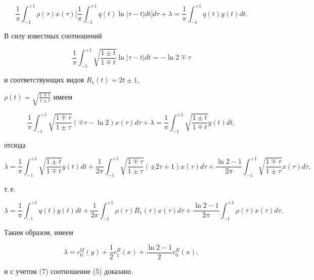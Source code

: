 \begin{pf}
$$


\frac{1}{\pi} \int_{-1}^{+1} \rho(\tau)x(\tau)\bigg[\frac{1}{\pi}


\int_{-1}^{+1}q(t)\ln |\tau-t|dt


\bigg]d\tau + \lambda = \frac{1}{\pi}\int_{-1}^{+1}q(t)y(t)dt.


$$


В силу известных соотношений


$$


\frac{1}{\pi}\int_{-1}^{+1} \sqrt{\frac{1\pm t}{1\mp t}} \ln |\tau-t|dt =


-\ln 2 \mp \tau


$$


и соответствующих видов $R_1(t)=2t\pm 1$,


$\rho(t) = \sqrt{\frac{1\mp t}{1\pm t}}$ имеем


$$


\frac{1}{\pi}\int_{-1}^{+1}\sqrt{\frac{1\mp \tau}{1\pm \tau}}


(\mp \tau- \ln 2)x(\tau)d\tau+\lambda=


\frac{1}{\pi}\int_{-1}^{+1}\sqrt{\frac{1\pm t}{1\mp t}}y(t)dt,


$$


отсюда


$$


\lambda = \frac{1}{\pi}\int_{-1}^{+1} \sqrt{\frac{1\pm t}{1\mp t}}y(t)dt +


\frac{1}{2\pi}\int_{-1}^{+1} \sqrt{\frac{1\mp \tau}{1\pm \tau}}


(\pm 2\tau+1)x(\tau)d\tau +


\frac{\ln 2 -1}{2\pi}\int_{-1}^{+1}\sqrt{\frac{1\mp \tau}{1\pm \tau}}


x(\tau)d\tau,


$$


т.\,е.


$$


\lambda = \frac{1}{\pi}\int_{-1}^{+1}q(t)y(t)dt +


\frac{1}{2\pi}\int_{-1}^{+1}\rho(\tau)R_1(\tau)x(\tau)d\tau +


\frac{\ln 2 - 1}{2\pi} \int_{-1}^{+1}\rho(\tau)x(\tau)d\tau.


$$


Таким образом, имеем


$$


\lambda = c_0^Q(y) + \frac{1}{2}c_1^R(x) + \frac{\ln 2 -1}{2}c_0^R(x),


$$


и с учетом (7) соотношение (5) доказано.






\end{pf}
